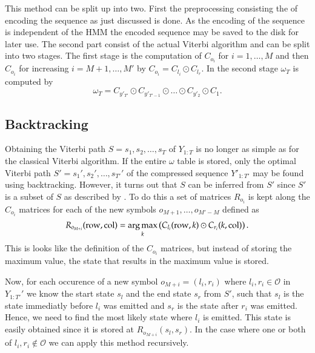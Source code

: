 This method can be split up into two. First the preprocessing consisting the of
encoding the sequence as just discussed is done. As the encoding of the
sequence is independent of the HMM the encoded sequence may be saved to the
disk for later use. The second part consist of the actual Viterbi algorithm
and can be split into two stages. The first stage is the computation of
$C_{o_i}$ for $i = 1, \dots, M$ and then $C_{o_i}$ for increasing
$i = M + 1, \dots, M'$ by $C_{o_i} = C_{l_i} \odot C_{l_r}$. In the second
stage $\omega_T$ is computed by
\begin{equation}
  \label{eq:3}
  \omega_T = C_{y'_{T'}} \odot C_{y'_{T'-1}} \odot \dots \odot C_{y'_2} \odot C_1.
\end{equation}

\subsection{Backtracking}
\label{sec:backtracking}

Obtaining the Viterbi path $S = s_1, s_2, \dots, s_T$ of $Y_{1:T}$ is no longer
as simple as for the classical Viterbi algorithm. If the entire $\omega$ table
is stored, only the optimal Viterbi path $S' = s_1', s_2', \dots, s_{T'}'$ of
the compressed sequence $Y'_{1:T'}$ may be found using backtracking. However,
it turns out that $S$ can be inferred from $S'$ since $S'$ is a subset of $S$
as described by \citet{lifshits2009speeding}. To do this a set of matrices
$R_{o_i}$ is kept along the $C_{o_i}$ matrices for each of the new symbols
$o_{M + 1}, \dots, o_{M' - M}$ defined as
\begin{equation*}
  R_{o_{M + i}}(\text{row}, \text{col}) = \operatorname*{arg\,max}_k
  \left(
    C_{l_i}(\text{row}, k) \odot C_{r_i}(k, \text{col})
  \right).
\end{equation*}
This is looks like the definition of the $C_{o_i}$ matrices, but instead of
storing the maximum value, the state that results in the maximum value is
stored.

Now, for each occurence of a new symbol $o_{M + i} = (l_i, r_i)$ where
$l_i, r_i \in \mathcal{O}$ in $Y_{1:T'}'$ we know the start state $s_l$ and the
end state $s_r$ from $S'$, such that $s_l$ is the state immediatly before $l_i$
was emitted and $s_r$ is the state after $r_i$ was emitted. Hence, we need to
find the most likely state where $l_i$ is emitted. This state is easily
obtained since it is stored at $R_{o_{M + i}}(s_l, s_r)$. In the case where one
or both of $l_i, r_i \not \in \mathcal{O}$ we can apply this method
recursively.

